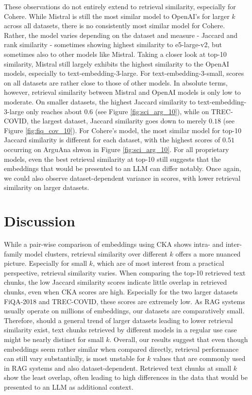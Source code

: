 \documentclass[nonacm,sigconf]{acmart}
\begin{document}
These observations do not entirely extend to retrieval similarity, especially for Cohere. While Mistral is still the most similar model to OpenAI's for larger $k$ across all datasets, there is no consistently most similar model for Cohere. Rather, the model varies depending on the dataset and measure - Jaccard and rank similarity - sometimes showing highest similarity to e5-large-v2, but sometimes also to other models like Mistral. Taking a closer look at top-10 similarity, Mistral still largely exhibits the highest similarity to the OpenAI models, especially to text-embedding-3-large. For text-embedding-3-small, scores on all datasets are rather close to those of other models. In absolute terms, however, retrieval similarity between Mistral and OpenAI models is only low to moderate. On smaller datasets, the highest Jaccard similarity to text-embedding-3-large only reaches about $0.6$ (see Figure \ref{fig:sci_arg_10}), while on TREC-COVID, the largest dataset, Jaccard similarity goes down to merely $0.18$ (see Figure \ref{fig:fiq_cov_10}). For Cohere's model, the most similar model for top-10 Jaccard similarity is different for each dataset, with the highest scores of $0.51$ occurring on ArguAna shwon in Figure \ref{fig:sci_arg_10}. For all proprietary models, even the best retrieval similarity at top-10 still suggests that the embeddings that would be presented to an LLM can differ notably. Once again, we could also observe dataset-dependent variance in scores, with lower retrieval similarity on larger datasets.

\section{Discussion}

While a pair-wise comparison of embeddings using CKA shows intra- and inter-family model clusters, retrieval similarity over different $k$ offers a more nuanced picture. Especially for small $k$, which are of most interest from a practical perspective, retrieval similarity varies. When comparing the top-10 retrieved text chunks, the low Jaccard similarity scores indicate little overlap in retrieved chunks, even when CKA scores are high. Especially for the two larger datasets FiQA-2018 and TREC-COVID, these scores are extremely low. As RAG systems usually operate on millions of embeddings, our datasets are comparatively small. Therefore, should a general trend of larger datasets leading to lower retrieval similarity exist, text chunks retrieved by different models in a regular use case might be nearly distinct for small $k$. Overall, our results suggest that even though embeddings seem rather similar when compared directly, retrieval performance can still vary substantially, is most unstable for $k$ values that are commonly used in RAG systems and also dataset-dependent. Retrieved text chunks at small $k$ show the least overlap, often leading to high differences in the data that would be presented to an LLM as additional context.
\end{document}
